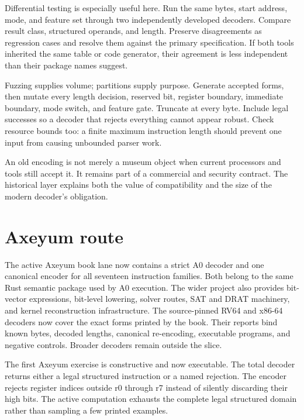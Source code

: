 Differential testing is especially useful here. Run the same bytes, start
address, mode, and feature set through two independently developed decoders.
Compare result class, structured operands, and length. Preserve disagreements
as regression cases and resolve them against the primary specification. If
both tools inherited the same table or code generator, their agreement is less
independent than their package names suggest.

Fuzzing supplies volume; partitions supply purpose. Generate accepted forms,
then mutate every length decision, reserved bit, register boundary, immediate
boundary, mode switch, and feature gate. Truncate at every byte. Include legal
successes so a decoder that rejects everything cannot appear robust. Check
resource bounds too: a finite maximum instruction length should prevent one
input from causing unbounded parser work.

\begin{archive}[title={Compatibility turns old bytes into present obligations}]
An old encoding is not merely a museum object when current processors and
tools still accept it. It remains part of a commercial and security contract.
The historical layer explains both the value of compatibility and the size of
the modern decoder's obligation.
\end{archive}

\section{Axeyum route}

The active Axeyum book lane now contains a strict A0 decoder and one canonical
encoder for all seventeen instruction families. Both belong to the same Rust
semantic package used by A0 execution. The wider project also provides
bit-vector expressions, bit-level lowering, solver routes, SAT and DRAT
machinery, and kernel reconstruction infrastructure. The source-pinned RV64
and x86-64 decoders now cover the exact forms printed by the book. Their
reports bind known bytes, decoded lengths, canonical re-encoding, executable
programs, and negative controls. Broader decoders remain outside the slice.

The first Axeyum exercise is constructive and now executable. The total decoder
returns either a legal structured instruction or a named rejection. The
encoder rejects register indices outside r0 through r7 instead of silently
discarding their high bits. The active computation exhausts the complete legal
structured domain rather than sampling a few printed examples.


